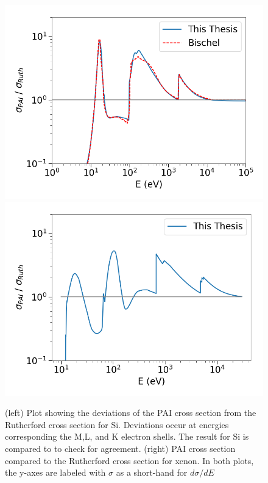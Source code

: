 \begin{figure}[htbp]
\begin{center}
\includegraphics[width=\halffig]{figures/lips/pai_si.png}
\includegraphics[width=\halffig]{figures/lips/pai_xe.png}
\caption{(left) Plot showing the deviations of the \acs{PAI} cross section from the Rutherford cross section for Si. Deviations occur at energies corresponding the M,L, and K electron shells. The result for Si is compared to \cite{Bichsel:2006} to check for agreement. (right) \acs{PAI} cross section compared to the Rutherford cross section for xenon. In both plots, the y-axes are labeled with $\sigma$ as a short-hand for $d\sigma/dE$}
\label{fig:sigma_pai}
\end{center}
\end{figure}

